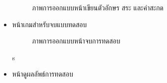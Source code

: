 \documentclass[12pt,oneside,openright,a4paper]{cpe-thai-project}
\begin{document}
\begin{itemize}
\begin{figure}[!ht]
    \setlength{\fboxsep}{1cm}
    \caption{ภาพการออกแบบหน้าเขียนตัวอักษร สระ และคำสะกด}\label{fig:system}
  \end{figure}
  \newpage
  \item หน้าเกมสำหรับจบแบบทดสอบ
  \begin{figure}[!ht]\centering
    \setlength{\fboxrule}{0.2mm} %
    \setlength{\fboxsep}{1cm}
    \caption{ภาพการออกแบบหน้าจบการทดสอบ}\label{fig:system}
  \end{figure}s
  \item หน้าดูผลลัพธ์การทดสอบ
    \begin{figure}[!ht]\centering
      \setlength{\fboxrule}{0.2mm} %
      \setlength{\fboxsep}{1cm}

\end{figure}
\end{itemize}
\end{document}
